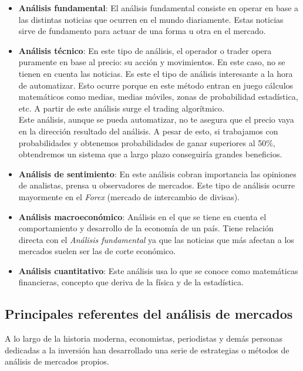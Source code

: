 \begin{itemize}
	
	\item \textbf{Análisis fundamental}: El análisis fundamental consiste en operar en base a las distintas noticias que ocurren en el mundo diariamente. Estas noticias sirve de fundamento para actuar de una forma u otra en el mercado. 
	\item \textbf{Análisis técnico}: En este tipo de análisis, el operador o trader opera puramente en base al precio: su acción y movimientos. En este caso, no se tienen en cuenta las noticias. Es este el tipo de análisis interesante a la hora de automatizar. Esto ocurre porque en este método entran en juego cálculos matemáticos como medias, medias móviles, zonas de probabilidad estadística, etc. A partir de este análisis surge el trading algorítmico. \\
	Este análisis, aunque se pueda automatizar, no te asegura que el precio vaya en la dirección resultado del análisis. A pesar de esto, si trabajamos con probabilidades y obtenemos probabilidades de ganar superiores al 50\%, obtendremos un sistema que a largo plazo conseguiría grandes beneficios.
	\item \textbf{Análisis de sentimiento}: En este análisis cobran importancia las opiniones de analistas, prensa u observadores de mercados. Este tipo de análisis ocurre mayormente en el \textit{Forex} (mercado de intercambio de divisas).
	\item \textbf{Análisis macroeconómico}: Análisis en el que se tiene en cuenta el comportamiento y desarrollo de la economía de un país. Tiene relación directa con el \textit{Análisis fundamental} ya que las noticias que más afectan a los mercados suelen ser las de corte económico.
	\item \textbf{Análisis cuantitativo}: Este análisis usa lo que se conoce como matemáticas financieras, concepto que deriva de la física y de la estadística.
\end{itemize} 

\subsection{Principales referentes del análisis de mercados}

A lo largo de la historia moderna, economistas, periodistas y demás personas dedicadas a la inversión han desarrollado una serie de estrategias o métodos de análisis de mercados propios. \newline

